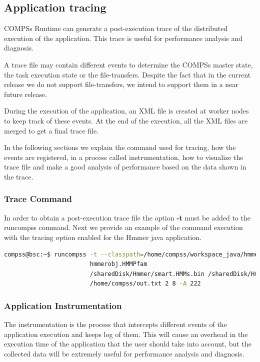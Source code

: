 \subsection{Application tracing}
\label{sec:Tracing}
COMPSs Runtime can generate a post-execution trace of the distributed execution of the application. This trace is useful for
performance analysis and diagnosis.

A trace file may contain different events to determine the COMPSs master state, the task execution state or the file-transfers.
Despite the fact that in the current release we do not support file-transfers, we intend to support them in a near future release.

During the execution of the application, an XML file is created at worker nodes to keep track of 
these events. At the end of the execution, all the XML files are merged to get a final trace file.

In the following sections we explain the command used for tracing, how the events are registered, 
in a process called instrumentation, how to visualize the trace file and make a good analysis of 
performance based on the data shown in the trace.

\subsubsection{Trace Command}
In order to obtain a post-execution trace file the option \textbf{-t}  must be added to the runcompss command. Next we provide an
example of the command execution with the tracing option enabled for the Hmmer java application.
\begin{lstlisting}[language=bash]
compss@bsc:~$ runcompss -t --classpath=/home/compss/workspace_java/hmmer/jar/hmmer.jar 
                        hmmerobj.HMMPfam 
                        /sharedDisk/Hmmer/smart.HMMs.bin /sharedDisk/Hmmer/256seq 
                        /home/compss/out.txt 2 8 -A 222
\end{lstlisting}
 

\subsubsection{Application Instrumentation}
The instrumentation is the process that intercepts different events of the application execution 
and keeps log of them. This will cause an overhead in the execution time of the application that 
the user should take into account, but the collected data will be extremely useful for performance 
analysis and diagnosis.

